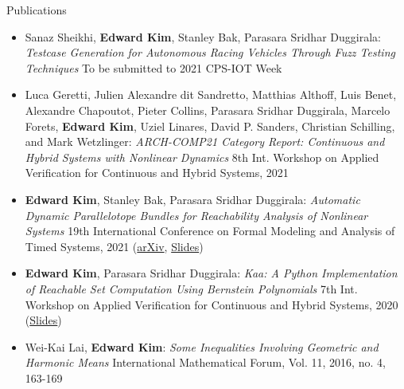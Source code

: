 \documentclass{resume} %
\begin{document}
\begin{rSection}{Publications}
  \begin{itemize}
    \item Sanaz Sheikhi, {\bf Edward Kim}, Stanley Bak, Parasara Sridhar Duggirala: \newline
    \textit{Testcase Generation for Autonomous Racing Vehicles Through Fuzz Testing Techniques} \newline
    To be submitted to 2021 CPS-IOT Week

    \item  Luca Geretti, Julien Alexandre dit Sandretto, Matthias Althoff, Luis Benet, Alexandre Chapoutot, Pieter Collins, Parasara Sridhar Duggirala, Marcelo Forets, {\bf Edward Kim}, Uziel Linares, David P. Sanders, Christian Schilling, and Mark Wetzlinger: \newline
    \textit{ARCH-COMP21 Category Report: Continuous and Hybrid Systems with Nonlinear Dynamics} \newline
    8th Int. Workshop on Applied Verification for Continuous and Hybrid Systems, 2021

    \item {\bf Edward Kim}, Stanley Bak, Parasara Sridhar Duggirala: \newline
    \textit{Automatic Dynamic Parallelotope Bundles for Reachability Analysis of Nonlinear Systems} \newline
    19th International Conference on Formal Modeling and Analysis of Timed Systems, 2021 \newline
    (\href{https://arxiv.org/abs/2105.11796}{arXiv}, \href{https://ekim1919.github.io/files/formats21.pdf)}{Slides})

    \item {\bf Edward Kim}, Parasara Sridhar Duggirala: \newline
    \textit{Kaa: A Python Implementation of Reachable Set Computation Using Bernstein Polynomials} \newline
    7th Int. Workshop on Applied Verification for Continuous and Hybrid Systems, 2020 \newline
    (\href{https://ekim1919.github.io/files/ARCH2020.pdf}{Slides})

    \item Wei-Kai Lai, {\bf Edward Kim}: \newline
    \textit{Some Inequalities Involving Geometric and Harmonic Means} \newline
    International Mathematical Forum, Vol. 11, 2016, no. 4, 163-169
  \end{itemize}
\end{rSection}
\end{document}
